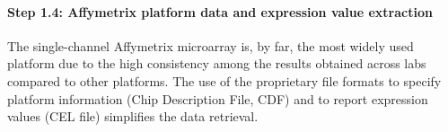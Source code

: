 














\paragraph{Step 1.4: Affymetrix platform data and expression value 
extraction}\label{sec:command-affy}


%
The single-channel Affymetrix microarray is, by far, the most widely used
platform due to the high consistency among the results obtained across labs
compared to other platforms\cite{Irizarry2005}.
%
The use of the proprietary file formats to specify platform information (Chip
Description File, CDF) and to report expression values (CEL file) simplifies
the data retrieval.


